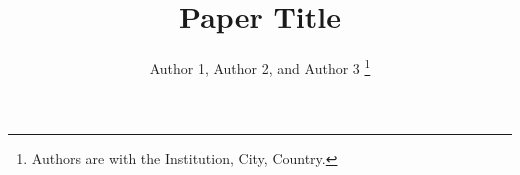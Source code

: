 \documentclass[journal,twoside,web]{ieeecolor}
\theoremstyle{plain}
\theoremstyle{definition}
\theoremstyle{remark}
\begin{document}
\title{Paper Title}

\author{
    Author 1,
    Author 2,
    and
    Author 3
    \thanks{Authors are with the Institution, City, Country.}
}


\maketitle

\begin{abstract}
\end{abstract}

\begin{IEEEkeywords}
\end{IEEEkeywords}















%

% 
\end{document}
